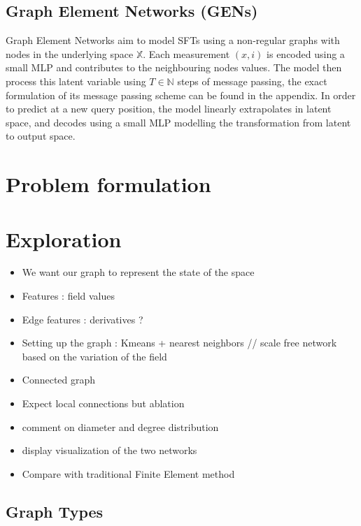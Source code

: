 \documentclass[a4paper,10pt]{article}
\begin{document}
\subsection{Graph Element Networks (GENs)}
Graph Element Networks \cite{alet2019gen} aim to model SFTs using a non-regular graphs with nodes in the underlying space $\mathbb{X}$. Each measurement $(x, i)$ is encoded using a small MLP and contributes to the neighbouring nodes values. The model then process this latent variable using $T \in \mathbb{N}$ steps of message passing, the exact formulation of its message passing scheme can be found in the appendix.
In order to predict at a new query position, the model linearly extrapolates in latent space, and decodes using a small MLP modelling the transformation from latent to output space.

\section{Problem formulation}

\section{Exploration}

\begin{itemize}
  \item We want our graph to represent the state of the space
  \item Features : field values
  \item Edge features : derivatives ?
  \item Setting up the graph : Kmeans + nearest neighbors // scale free network based on the variation of the field
  \item Connected graph
  \item Expect local connections but ablation
  \item comment on diameter and degree distribution
  \item display visualization of the two networks
  \item Compare with traditional Finite Element method
\end{itemize}

\subsection{Graph Types}
\end{document}

